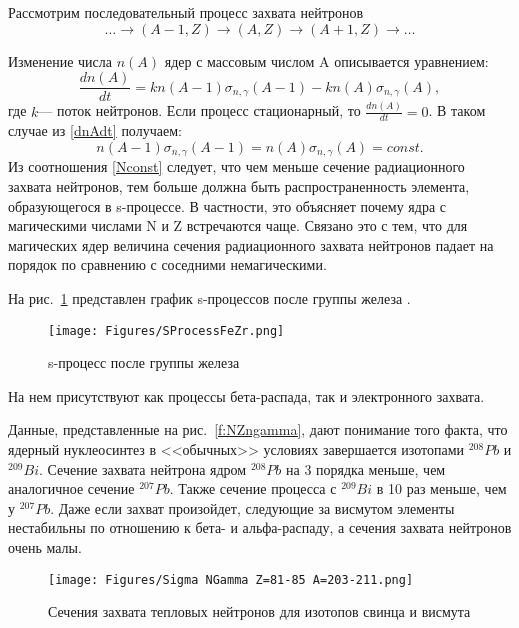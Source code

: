 \documentclass[a5paper,openany]{book}
\begin{document}
Рассмотрим последовательный процесс захвата нейтронов  \cite{MSU98}
\begin{equation}
\ldots \longrightarrow (A-1, Z) \longrightarrow (A, Z) \longrightarrow (A+1, Z) \longrightarrow \ldots
\end{equation}

Изменение числа $n(A)$ ядер с массовым числом A описывается уравнением:
\begin{equation}\label{dnAdt}
\frac{dn(A)}{dt} = kn(A-1)\sigma_{n,\gamma}(A-1) - kn(A)\sigma_{n,\gamma}(A),
\end{equation}
где $k$--- поток нейтронов. Если процесс стационарный, то $\frac{dn(A)}{dt} =0$. В таком случае из \eqref{dnAdt} получаем:
\begin{equation} \label{Nconst}
n(A-1)\sigma_{n,\gamma}(A-1) = n(A)\sigma_{n,\gamma}(A) = const.
\end{equation}
Из соотношения \eqref{Nconst} следует, что чем меньше сечение радиационного захвата нейтронов, тем больше должна быть распространенность элемента, образующегося в s-процессе. В частности, это объясняет почему ядра с магическими числами N и Z встречаются чаще. Связано это с тем, что для магических ядер величина сечения радиационного захвата нейтронов падает на порядок по сравнению с соседними немагическими. 

 
На рис.~\ref{f:SProcessFeZr} представлен график s-процессов после группы железа \cite{s-process2007}.
\begin{figure}[h] 
	\centering\small
	\unitlength=1mm
		\texttt{[image: Figures/SProcessFeZr.png]} %
	\caption{s-процесс после группы железа \cite{s-process2007}} 
	\label{f:SProcessFeZr}
\end{figure}
На нем присутствуют как процессы бета-распада, так и электронного захвата. 


Данные, представленные на рис.~\ref{f:NZngamma}, дают понимание того факта, что ядерный нуклеосинтез в <<обычных>> условиях завершается изотопами $^{208}Pb$ и $^{209}Bi$. 
Сечение захвата нейтрона ядром  $^{208}Pb$ на 3 порядка меньше, чем аналогичное сечение $^{207}Pb$. Также сечение процесса с  $^{209}Bi$ в 10 раз меньше, чем у $^{207}Pb$.
Даже если захват произойдет, следующие за висмутом элементы нестабильны по отношению к бета- и альфа-распаду, а сечения захвата нейтронов очень малы.


\begin{figure}[h] 
	\centering\small
	\unitlength=1mm
		\texttt{[image: Figures/Sigma NGamma Z=81-85 A=203-211.png]}
	\caption{Сечения захвата тепловых нейтронов для изотопов свинца и висмута} 
	\label{f:NZngammaPb}
\end{figure}
\end{document}
